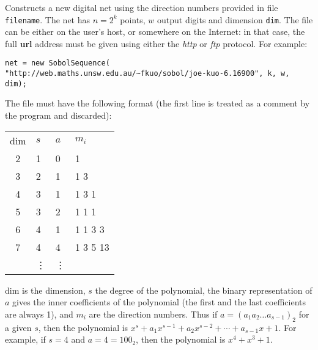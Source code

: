 \begin{tabb}
   Constructs a new digital net using the direction numbers provided in file
   \texttt{filename}. The net has $n = 2^k$ points, $w$ output digits and
   dimension \texttt{dim}. The file can be either on the user's host, or
   somewhere on the Internet: in that case, the full \textbf{url} address must
   be given using either the \emph{http} or \emph{ftp} protocol. For
   example:

   \texttt{net = new SobolSequence(\\ 
      "http://web.maths.unsw.edu.au/\~{}fkuo/sobol/joe-kuo-6.16900", k, w, dim);}

   The file must have the following format
(the first line is treated as a comment by the program and discarded):
%
\begin{center}
\begin {tabular}{|c|l|l|l|}
\hline
dim & $s$  & $a$  & $m_i$ \\
2  & 1 & 0 & 1 \\
3  & 2 & 1 & 1 3 \\
4  & 3 & 1 & 1 3 1 \\
5  & 3 & 2 & 1 1 1 \\
6  & 4 & 1 & 1 1 3 3 \\
7  & 4 & 4 & 1 3 5 13 \\
  &\vdots &\vdots  & \\
\hline
\end {tabular}
\end{center}
%
 dim is the
dimension, $s$ the degree of the polynomial, the binary representation of $a$
  gives the inner coefficients of the polynomial
 (the first and the last coefficients are always 1), and $m_i$ are the 
direction numbers. Thus if $a = (a_1 a_2 \ldots a_{s-1})_2$ for a given $s$,
then the polynomial is $x^s + a_1x^{s-1} + a_2x^{s-2} + \cdots + a_{s-1} x + 1$. 
For example, if $s=4$ and $a=4 = 100_2$, then the
polynomial is $x^4 + x^3 +1$. 
\end{tabb}
\begin{htmlonly}
\end{htmlonly}
